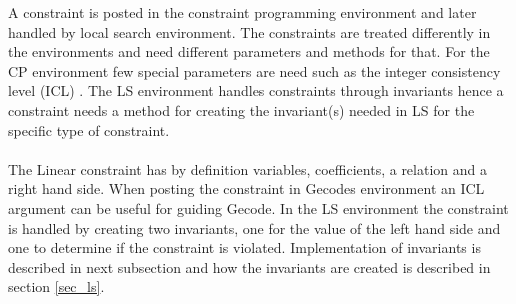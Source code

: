 A constraint is posted in the constraint programming environment and later handled by local search environment. The 
constraints are treated differently in the environments and need different parameters and methods for that. For the 
CP environment few special parameters are need such as the integer consistency level (ICL) . The LS 
environment handles constraints through invariants hence a constraint needs a method for creating the invariant(s) 
needed in LS for the specific type of constraint. \\ 
 \\
The Linear constraint has by definition variables, coefficients, a relation and a right hand side. When posting the 
constraint in Gecodes environment an ICL argument can be useful for guiding Gecode. In the LS environment the 
constraint is handled by creating two invariants, one for the value of the left hand side and one to determine if the 
constraint is violated. Implementation of invariants is described in next subsection and how the invariants are created 
is described in section \ref{sec_ls}. 